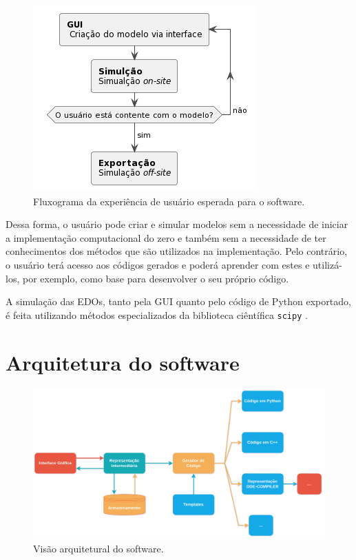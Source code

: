 \documentclass[
	12pt,				%
	openright,			%
	oneside,			%
	a4paper,			%
	main=brazil,
	english,			%
	]{ufsj-abntex2}
\begin{document}
\begin{figure}[h]
    \centering
    \includegraphics[scale=1]{diagrams/img/fluxograma-exp.png}
    \caption{Fluxograma da experiência de usuário esperada para o software.}
    \label{fig::experiencia_usuario}
\end{figure}

Dessa forma, o usuário pode criar e simular modelos sem a necessidade de iniciar a implementação computacional do zero e também sem a necessidade de ter conhecimentos dos métodos que são utilizados na implementação. Pelo contrário, o usuário terá acesso aos códigos gerados e poderá aprender com estes e utilizá-los, por exemplo, como base para desenvolver o seu próprio código. 

A simulação das EDOs, tanto pela GUI quanto pelo código de Python exportado, é feita utilizando métodos especializados da biblioteca ciêntífica \texttt{scipy} \cite{scipy}. %

\section{Arquitetura do software}

\begin{figure}[h]
    \centering
    \includegraphics[scale=0.125]{imgs/passos_divisao_software.png} 
    \caption{Visão arquitetural do software.}
    \label{fig::arquitetura_software}
\end{figure}
\end{document}
